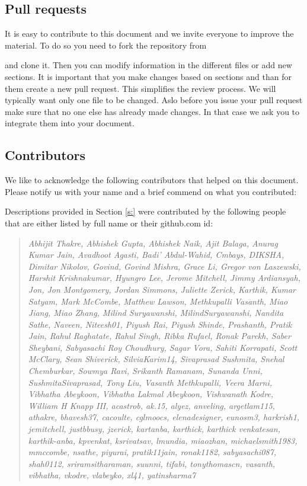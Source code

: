 \subsection{Pull requests}

It is easy to contribute to this document and we invite everyone to
improve the material. To do so you need to fork the repository from 


and clone it. Then you can modify information in the different files
or add new sections. It is important that you make changes based on
sections and than for them create a new pull request. This simplifies
the review process. We will typically want only one file to be
changed. Aslo before you issue your pull request make sure that no one
else has already made changes. In that case we ask you to integrate
them into your document.



\subsection{Contributors}

We like to acknowledge the following contributors that helped on this
document. Please notify us with your name and a brief commend on what
you contributed:

Descriptions provided in Section \ref{s:} were contributed by the
following people that are either listed by full name or their
github.com id:

\begin{quotation}{\em
Abhijit Thakre, Abhishek Gupta, Abhishek Naik, Ajit Balaga, Anurag
Kumar Jain, Avadhoot Agasti, Badi' Abdul-Wahid, Cmbays, DIKSHA,
Dimitar Nikolov, Govind, Govind Mishra, Grace Li, Gregor von
Laszewski, Harshit Krishnakumar, Hyungro Lee, Jerome Mitchell, Jimmy
Ardiansyah, Jon, Jon Montgomery, Jordan Simmons, Juliette Zerick,
Karthik, Kumar Satyam, Mark McCombe, Matthew Lawson, Methkupalli
Vasanth, Miao Jiang, Miao Zhang, Milind Suryawanshi,
MilindSuryawanshi, Nandita Sathe, Naveen, Niteesh01, Piyush Rai,
Piyush Shinde, Prashanth, Pratik Jain, Rahul Raghatate, Rahul Singh,
Ribka Rufael, Ronak Parekh, Saber Sheybani, Sabyasachi Roy Choudhury,
Sagar Vora, Sahiti Korrapati, Scott McClary, Sean Shiverick,
SilviaKarim14, Sivaprasad Sushmita, Snehal Chemburkar, Sowmya Ravi,
Srikanth Ramanam, Sunanda Unni, SushmitaSivaprasad, Tony Liu, Vasanth
Methkupalli, Veera Marni, Vibhatha Abeykoon, Vibhatha Lakmal Abeykoon,
Vishwanath Kodre, William H Knapp III, acastrob, ak.15, alyez,
anveling, argetlam115, athakre, bhavesh37, cacoulte, cglmoocs,
elenadesigner, eunosm3, harkrish1, jemitchell, justbbusy, jzerick,
kartanba, karthick, karthick venkatesan, karthik-anba, kpvenkat,
ksrivatsav, lmundia, miaozhan, michaelsmith1983, mmccombe, nsathe,
piyurai, pratik11jain, ronak1182, sabyasachi087,
shah0112, sriramsitharaman, suunni, tifabi, tonythomascn, vasanth,
vibhatha, vkodre, vlabeyko, xl41, yatinsharma7
}\end{quotation}


